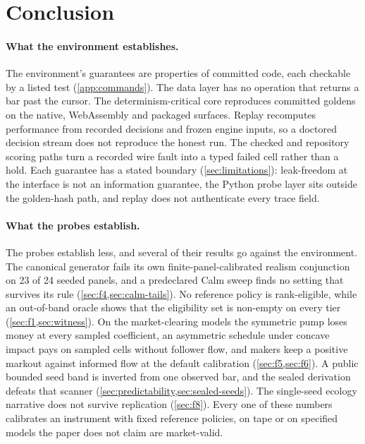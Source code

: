 \section{Conclusion}\label{sec:conclusion}

\paragraph{What the environment establishes.} The environment's guarantees are properties of committed code, each checkable by a listed test (\cref{app:commands}). The data layer has no operation that returns a bar past the cursor. The determinism-critical core reproduces committed goldens on the native, WebAssembly and packaged surfaces. Replay recomputes performance from recorded decisions and frozen engine inputs, so a doctored decision stream does not reproduce the honest run. The checked and repository scoring paths turn a recorded wire fault into a typed failed cell rather than a hold. Each guarantee has a stated boundary (\cref{sec:limitations}): leak-freedom at the interface is not an information guarantee, the Python probe layer sits outside the golden-hash path, and replay does not authenticate every trace field.

\paragraph{What the probes establish.} The probes establish less, and several of their results go against the environment. The canonical generator fails its own finite-panel-calibrated realism conjunction on 23 of 24 seeded panels, and a predeclared Calm sweep finds no setting that survives its rule (\cref{sec:f4,sec:calm-tails}). No reference policy is rank-eligible, while an out-of-band oracle shows that the eligibility set is non-empty on every tier (\cref{sec:f1,sec:witness}). On the market-clearing models the symmetric pump loses money at every sampled coefficient, an asymmetric schedule under concave impact pays on sampled cells without follower flow, and makers keep a positive markout against informed flow at the default calibration (\cref{sec:f5,sec:f6}). A public bounded seed band is inverted from one observed bar, and the sealed derivation defeats that scanner (\cref{sec:predictability,sec:sealed-seeds}). The single-seed ecology narrative does not survive replication (\cref{sec:f8}). Every one of these numbers calibrates an instrument with fixed reference policies, on tape or on specified models the paper does not claim are market-valid.

